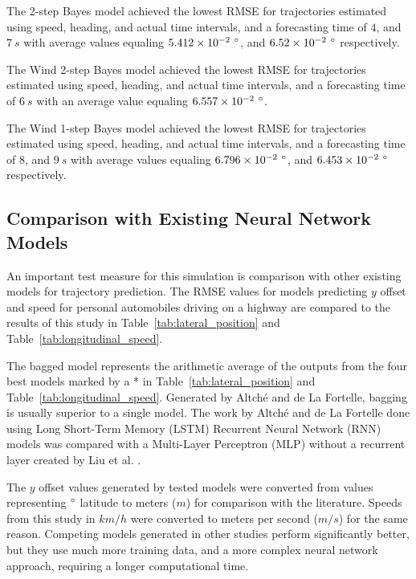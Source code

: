 \documentclass[preprint,12pt]{elsarticle}
\begin{document}
The 2-step Bayes model achieved the lowest RMSE for trajectories estimated using speed, heading, and actual time intervals, and a forecasting time of $4$, and $7 \ s$ with average values equaling $5.412 \times 10^{-2} \ \degree$, and $6.52 \times 10^{-2} \ \degree$ respectively.

The Wind 2-step Bayes model achieved the lowest RMSE for trajectories estimated using speed, heading, and actual time intervals, and a forecasting time of $6 \ s$ with an average value equaling $6.557 \times 10^{-2} \ \degree$.

The Wind 1-step Bayes model achieved the lowest RMSE for trajectories estimated using speed, heading, and actual time intervals, and a forecasting time of $8$, and $9 \ s$ with average values equaling $6.796 \times 10^{-2} \ \degree$, and $6.453 \times 10^{-2} \ \degree$ respectively.

\subsection{Comparison with Existing Neural Network Models}

An important test measure for this simulation is comparison with other existing models for trajectory prediction. The RMSE values for models predicting $y$ offset and speed for personal automobiles driving on a highway are compared to the results of this study in Table~\ref{tab:lateral_position} and Table~\ref{tab:longitudinal_speed}.

The bagged model represents the arithmetic average of the outputs from the four best models marked by a * in Table~\ref{tab:lateral_position} and Table~\ref{tab:longitudinal_speed}. Generated by Altché and de La Fortelle, bagging is usually superior to a single model. The work by Altché and de La Fortelle \cite{altche2017lstm} done using Long Short-Term Memory (LSTM) Recurrent Neural Network (RNN) models was compared with a Multi-Layer Perceptron (MLP) without a recurrent layer created by Liu et al. \cite{liu2014vehicle}.

The $y$ offset values generated by tested models were converted from values representing $\degree$ latitude to meters ($m$) for comparison with the literature. Speeds from this study in $km/h$ were converted to meters per second ($m/s$) for the same reason. Competing models generated in other studies perform significantly better, but they use much more training data, and a more complex neural network approach, requiring a longer computational time.
\end{document}
